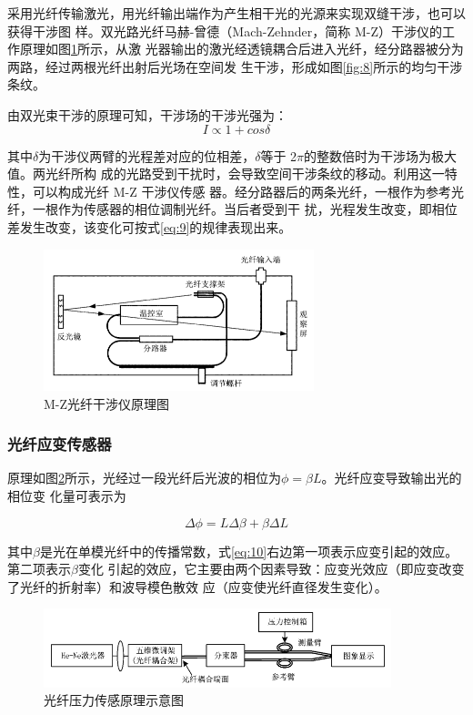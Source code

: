 \documentclass[10pt,a4paper,twoside,UTF8]{ctexart}
\begin{document}
采用光纤传输激光，用光纤输出端作为产生相干光的光源来实现双缝干涉，也可以获得干涉图
样。双光路光纤马赫-曾德（Mach-Zehnder，简称 M-Z）干涉仪的工作原理如图\ref{fig:9}所示，从激
光器输出的激光经透镜耦合后进入光纤，经分路器被分为两路，经过两根光纤出射后光场在空间发
生干涉，形成如图\ref{fig:8}所示的均匀干涉条纹。

由双光束干涉的原理可知，干涉场的干涉光强为：
\begin{equation}
	I \propto  1+cos\delta
	\label{eq:9}
\end{equation}

其中$\delta$为干涉仪两臂的光程差对应的位相差，$\delta$等于 2$\pi$的整数倍时为干涉场为极大值。两光纤所构
成的光路受到干扰时，会导致空间干涉条纹的移动。利用这一特性，可以构成光纤 M-Z 干涉仪传感
器。经分路器后的两条光纤，一根作为参考光纤，一根作为传感器的相位调制光纤。当后者受到干
扰，光程发生改变，即相位差发生改变，该变化可按式\ref{eq:9}的规律表现出来。

\begin{figure}[H]
	\centering
	\includegraphics[width=0.7\textwidth]{img//9.png}
	\caption{M-Z光纤干涉仪原理图}
	\label{fig:9}
\end{figure}

\subsubsection{光纤应变传感器}
原理如图\ref{fig:10}所示，光经过一段光纤后光波的相位为$\phi = \beta L$。光纤应变导致输出光的相位变
化量可表示为

\begin{equation}
	\varDelta \phi = L \varDelta \beta + \beta \varDelta L
	\label{eq:10}
\end{equation}

其中$\beta$是光在单模光纤中的传播常数，式\ref{eq:10}右边第一项表示应变引起的效应。第二项表示$\beta$变化
引起的效应，它主要由两个因素导致：应变光效应（即应变改变了光纤的折射率）和波导模色散效
应（应变使光纤直径发生变化）。

\begin{figure}[H]
	\centering
	\includegraphics[width=0.9\textwidth]{img//10.png}
	\caption{光纤压力传感原理示意图}
	\label{fig:10}
\end{figure}
\end{document}
